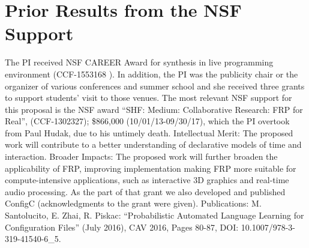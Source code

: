 \section{Prior Results from the NSF Support}

The PI received NSF CAREER Award for synthesis in live programming environment
(CCF-1553168 ). In addition, the PI was the publicity chair or the organizer of various
conferences and summer school and she received three grants to support students' visit 
to those venues. The most relevant NSF support for this proposal is the
NSF award ``SHF: Medium: Collaborative Research: FRP for Real'',
(CCF-1302327); \$866,000 (10/01/13-09/30/17), which the PI overtook  from 
Paul Hudak, due to his untimely death. Intellectual Merit: The
proposed work will contribute to a better understanding of declarative models
of time and interaction. Broader Impacts: The proposed work will further broaden
the applicability of FRP, improving implementation making FRP more suitable for
compute-intensive applications, such as interactive 3D graphics and real-time audio
processing. As the part of that grant we also developed and published ConfigC
(acknowledgments to the grant were given). Publications: M. Santolucito, 
E. Zhai, R. Piskac: ``Probabilistic Automated Language Learning for Configuration Files''
(July 2016), CAV 2016, Pages 80-87, DOI: 10.1007/978-3-319-41540-6\_5.

